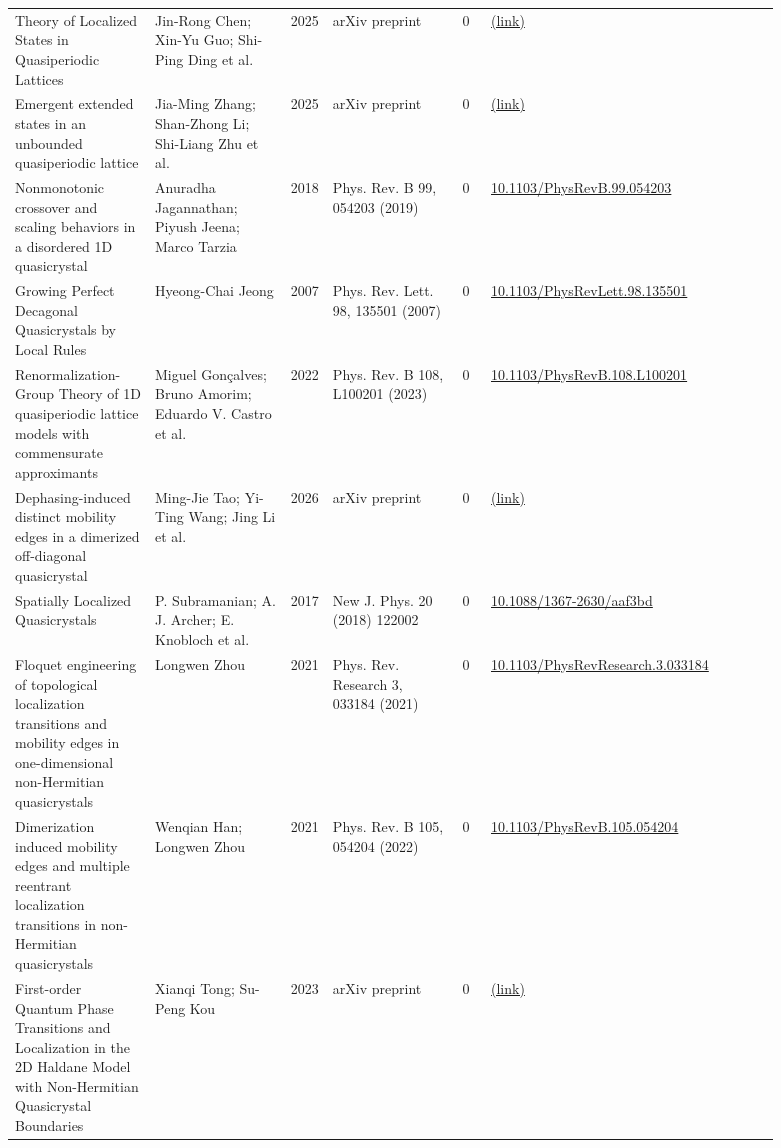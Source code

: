 \documentclass[10pt,a4paper]{article}
\begin{document}
{\begin{longtable}{p{0.192\linewidth}p{0.192\linewidth}p{0.043\linewidth}p{0.192\linewidth}p{0.043\linewidth}p{0.132\linewidth}p{0.096\linewidth}}
Theory of Localized States in Quasiperiodic Lattices & Jin-Rong Chen; Xin-Yu Guo; Shi-Ping Ding et al. & 2025 & arXiv preprint & 0 & \href{http://arxiv.org/abs/2509.05950v1}{(link)} &  \\
Emergent extended states in an unbounded quasiperiodic lattice & Jia-Ming Zhang; Shan-Zhong Li; Shi-Liang Zhu et al. & 2025 & arXiv preprint & 0 & \href{http://arxiv.org/abs/2502.13503v1}{(link)} &  \\
Nonmonotonic crossover and scaling behaviors in a disordered 1D quasicrystal & Anuradha Jagannathan; Piyush Jeena; Marco Tarzia & 2018 & Phys. Rev. B 99, 054203 (2019) & 0 & \href{https://doi.org/10.1103/PhysRevB.99.054203}{10.1103/PhysRevB.99.054203} &  \\
Growing Perfect Decagonal Quasicrystals by Local Rules & Hyeong-Chai Jeong & 2007 & Phys. Rev. Lett. 98, 135501 (2007) & 0 & \href{https://doi.org/10.1103/PhysRevLett.98.135501}{10.1103/PhysRevLett.98.135501} &  \\
Renormalization-Group Theory of 1D quasiperiodic lattice models with commensurate approximants & Miguel Gonçalves; Bruno Amorim; Eduardo V. Castro et al. & 2022 & Phys. Rev. B 108, L100201 (2023) & 0 & \href{https://doi.org/10.1103/PhysRevB.108.L100201}{10.1103/PhysRevB.108.L100201} &  \\
Dephasing-induced distinct mobility edges in a dimerized off-diagonal quasicrystal & Ming-Jie Tao; Yi-Ting Wang; Jing Li et al. & 2026 & arXiv preprint & 0 & \href{http://arxiv.org/abs/2608.17937v1}{(link)} &  \\
Spatially Localized Quasicrystals & P. Subramanian; A. J. Archer; E. Knobloch et al. & 2017 & New J. Phys. 20 (2018) 122002 & 0 & \href{https://doi.org/10.1088/1367-2630/aaf3bd}{10.1088/1367-2630/aaf3bd} &  \\
Floquet engineering of topological localization transitions and mobility edges in one-dimensional non-Hermitian quasicrystals & Longwen Zhou & 2021 & Phys. Rev. Research 3, 033184 (2021) & 0 & \href{https://doi.org/10.1103/PhysRevResearch.3.033184}{10.1103/PhysRevResearch.3.033184} &  \\
Dimerization induced mobility edges and multiple reentrant localization transitions in non-Hermitian quasicrystals & Wenqian Han; Longwen Zhou & 2021 & Phys. Rev. B 105, 054204 (2022) & 0 & \href{https://doi.org/10.1103/PhysRevB.105.054204}{10.1103/PhysRevB.105.054204} &  \\
First-order Quantum Phase Transitions and Localization in the 2D Haldane Model with Non-Hermitian Quasicrystal Boundaries & Xianqi Tong; Su-Peng Kou & 2023 & arXiv preprint & 0 & \href{http://arxiv.org/abs/2309.09173v1}{(link)} &  \\

\end{longtable}}
\end{document}
